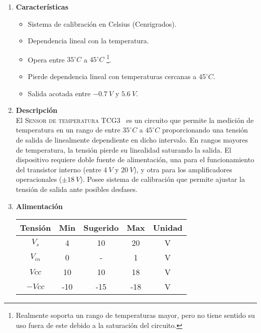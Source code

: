 

\begin{enumerate}
	\item[1] \textbf{Características}
	\begin{itemize}
		\item Sistema de calibración en Celsius (Cenrigrados).
		\item Dependencia lineal con la temperatura.
		\item Opera entre $35^{\circ}C$ a $45^{\circ}C$ \footnote{Realmente soporta un rango de temperaturas mayor, pero no tiene sentido su uso fuera de este debido a la saturación del circuito.}.
		\item Pierde dependencia lineal con temperaturas cercanas a $45^{\circ}C$.
		\item Salida acotada entre $-0.7 \ V$ y $5.6 \ V$.
	\end{itemize}
	
	\item[2] \textbf{Descripción}\\
		El \textsc{Sensor de temperatura TCG3~\textsuperscript{\textregistered}} es un circuito que permite la medición de temperatura en un rango de entre $35^{\circ}C$ a $45^{\circ}C$ proporcionando una tensión de salida de linealmente dependiente en dicho intervalo. En rangos mayores de temperatura, la tensión pierde su linealidad saturando la salida. El dispositivo requiere doble fuente de alimentación, una para el funcionamiento del transistor interno (entre $4 \ V$ y $20 \ V$), y otra para los amplificadores operacionales ($\pm 18 \ V$). Posee sistema de calibración que permite ajustar la tensión de salida ante posibles desfases.
	
	\item[3] \textbf{Alimentación}\\
	\begin{table}[H]
		\begin{tabular}{ccccc}
			\hline
			Tensión & Min & Sugerido & Max & Unidad \\
			\hline
			$V_s$       & 4   	& 10       & 20  	& V \\
			$V_{in}$    & 0 	& -		   & 1	 	& V \\
			$Vcc$       & 10  	& 10       & 18 	& V \\
			$-Vcc$      & -10 	& -15      & -18 	& V	\\
			\hline
		\end{tabular}
	\end{table}
		

\end{enumerate}
